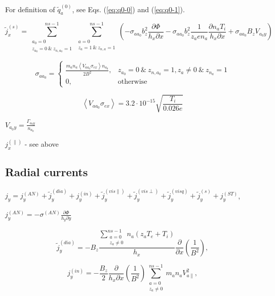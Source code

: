 \documentclass[a4paper,10pt]{report}
\begin{document}
For definition of $\widetilde{q}_a^{(0)}$, see Eqs. (\ref{eq:q0-0}) and (\ref{eq:q0-1}).

\begin{equation}
\widetilde j_x^{(s)} =
\sum \limits^{ns-1}_{\substack{a_0 = 0 \\ z_{a_0} = 0~\&~z_{n,a_0} = 1 }}
\sum \limits^{ns-1}_{\substack{a = 0 \\ z_{a} = 1~\&~z_{n,a} = 1 }}
\left(
- \sigma_{aa_0} b_z^2 \frac{\partial \Phi}{h_x \partial x}
- \sigma_{aa_0} b_z^2 \frac{1}{z_a e n_a} \frac{\partial n_a T_i}{h_x \partial x}
+ \sigma_{aa_0} B_z V_{a_{0}y}
\right)
\end{equation}

\begin{equation}
\sigma_{aa_0} =
\left\{
\begin{matrix}
\frac{m_a n_a \left\langle V_{aa_0} \sigma_{ex} \right\rangle n_{a_0}}{2 B^2}, &
z_{a_0} = 0 ~ \& ~ z_{n,a_0} = 1, z_a \ne 0 ~ \& ~z_{n_a} = 1 \\
0, & \text{otherwise}
\end{matrix}
\right.
\end{equation}

\begin{equation}
\left\langle V_{aa_0} \sigma_{ex} \right\rangle = 3.2 \cdot 10^{-15} \sqrt{\frac{T_i}{0.026e}}
\end{equation}

$V_{a_{0}y} = \frac{\Gamma_{a_{0}y} }{n_{a_0}}$

$j_x^{(\parallel)}$ - see above

\subsection{Radial currents}

$j_y = j_y^{(AN)} + \widetilde j_y^{(dia)} + j_y^{(in)} + \widetilde j_y^{(vis \parallel)} + \widetilde j_y^{(vis \perp)}
+ \widetilde j_y^{(visq)} + \widetilde j_y^{(s)} + j_y^{(ST)}$,

$j_y^{(AN)} = - \sigma^{(AN)} \frac{\partial \Phi}{h_y \partial y} $

\begin{equation}
\widetilde j_y^{(dia)} = - B_z \frac{
	\sum \limits^{ns-1}_{\substack{a = 0 \\ z_a \neq 0}} n_a \left(
		z_a T_e + T_i
	\right)
}{h_x}
\frac{\partial}{\partial x}
\left( \frac{1}{B^2} \right),
\end{equation}

\begin{equation}
j_y^{(in)} = - \frac{B_z}2 \frac{\partial}{h_x \partial x}
\left( \frac{1}{B^2} \right)
\sum \limits^{ns-1}_{\substack{a = 0 \\ z_a \neq 0}} m_a n_a V^2_{a \parallel},
\end{equation}
\end{document}
